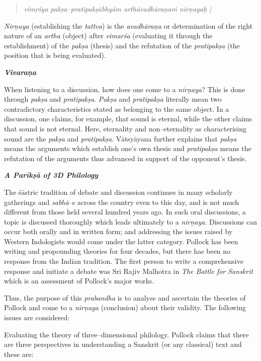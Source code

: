 \begin{verse}
\textit{vimṛśya pakṣa–pratipakṣābhyām arthāvadhāraṇaṁ nirṇayaḥ |}
\end{verse}

\textit{Nirṇaya} (establishing the \textit{tattva}) is the \textit{avadhāraṇa} or determination of the right nature of an \textit{artha} (object) after \textit{vimarśa} (evaluating it through the establishment) of the \textit{pakṣa} (thesis) and the refutation of the \textit{pratipakṣa} (the position that is being evaluated).

\textit{\textbf{Vivaraṇa}}

When listening to a discussion, how does one come to a \textit{nirṇaya}? This is done through \textit{pakṣa} and \textit{pratipakṣa}. \textit{Pakṣa} and \textit{pratipakṣa} literally mean two contradictory characteristics stated as belonging to the same object. In a discussion, one claims, for example, that sound is eternal, while the other claims that sound is not eternal. Here, eternality and non–eternality as characterising sound are the \textit{pakṣa} and \textit{pratipakṣa}. Vātsyāyana further explains that \textit{pakṣa} means the arguments which establish one's own thesis and \textit{pratipakṣa }means the refutation of the arguments thus advanced in support of the opponent's thesis.

\textbf{\textit{A Parīkṣā of 3D Philology}}

The śāstric tradition of debate and discussion continues in many scholarly gatherings and \textit{sabhā}–s across the country even to this day, and is not much different from those held several hundred years ago. In such oral discussions, a topic is discussed thoroughly which leads ultimately to a \textit{nirṇaya}. Discussions can occur both orally and in written form; and addressing the issues raised by Western Indologists would come under the latter category. Pollock has been writing and propounding theories for four decades, but there has been no response from the Indian tradition. The first person to write a comprehensive response and initiate a debate was Sri Rajiv Malhotra in \textit{The Battle for Sanskrit }which is an assessment of Pollock’s major works.

Thus, the purpose of this \textit{prabandha} is to analyse and ascertain the theories of Pollock and come to a \textit{nirṇaya} (conclusion) about their validity. The following issues are considered:

\item 
 Evaluating the theory of three–dimensional philology. Pollock claims that there are three perspectives in understanding a Sanskrit (or any classical) text and these are:


